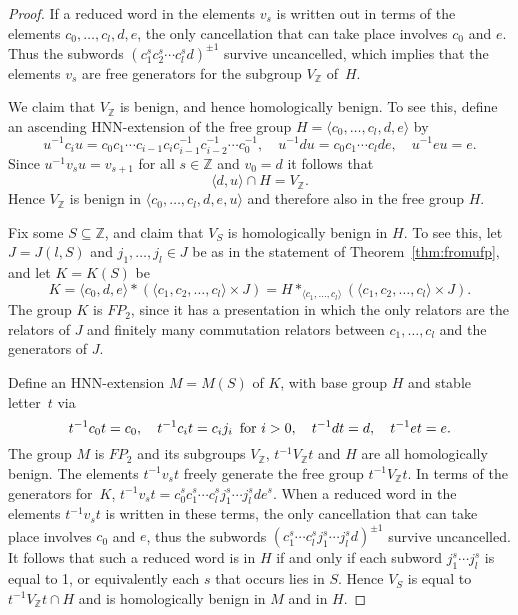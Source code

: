 \documentclass[12pt,a4paper]{article}
\newcommand{\zz}{{\mathbb Z}}
\begin{document}
\begin{proof} 
If a reduced word in the elements $v_s$ is written out in terms of the
elements $c_0,\ldots,c_l,d,e$, the only cancellation that can take
place involves $c_0$ and $e$.  Thus the subwords $(c_1^sc_2^s\cdots
c_l^sd)^{\pm 1}$ survive uncancelled, which implies that the elements $v_s$ are
free generators for the subgroup $V_\zz$ of~$H$.

We claim that $V_\zz$ is benign, and hence homologically benign.  To
see this, define an ascending HNN-extension of the free group
$H=\langle c_0,\ldots,c_l,d,e\rangle$ by
\[ u^{-1}c_iu = c_0c_1\cdots c_{i-1}c_ic_{i-1}^{-1}c_{i-2}^{-1}\cdots c_0^{-1}, 
\quad
u^{-1}du = c_0c_1\cdots c_lde, \quad 
u^{-1}eu = e.  \]
Since $u^{-1}v_su=v_{s+1}$ for all $s\in \zz$ and $v_0=d$ it follows that 
$$\langle d,u\rangle \cap H = V_\zz.$$ 
Hence $V_\zz$ is benign in $\langle c_0,\ldots,c_l,d,e,u\rangle$ and
therefore also in the free group $H$.  

Fix some $S\subseteq \zz$, and claim that $V_S$ is homologically 
benign in $H$.  To see 
this, let $J=J(l,S)$ and $j_1,\ldots, j_l\in J$ be as in the statement
of Theorem~\ref{thm:fromufp}, and let $K=K(S)$ be 
$$K=\langle c_0,d,e\rangle * (\langle c_1,c_2,\ldots, c_l\rangle \times 
J) = H*_{\langle c_1,\ldots,c_l\rangle} 
(\langle c_1,c_2,\ldots, c_l\rangle \times J).$$
The group $K$ is $FP_2$, since it has a presentation in which the 
only relators are the relators of $J$ and finitely many commutation 
relators between $c_1,\ldots, c_l$ and the generators of $J$.  

Define an HNN-extension $M=M(S)$ of $K$, with base group $H$ and stable 
letter~$t$ via
$$t^{-1}c_0t=c_0,\quad t^{-1}c_it= c_ij_i\,\,\,\hbox{for $i>0$},\quad 
t^{-1}dt=d,\quad t^{-1}et=e.$$ 
The group $M$ is $FP_2$ and its subgroups $V_\zz$, $t^{-1}V_\zz t$ and $H$ 
are all homologically benign.  The elements $t^{-1}v_st$ freely generate 
the free group $t^{-1}V_\zz t$.  In terms of the generators for~$K$, $t^{-1}v_st = 
c_0^sc_1^s\cdots c_l^sj_1^s\cdots j_l^s de^s$.  When a reduced word in 
the elements $t^{-1}v_st$ is written in these terms, the 
only cancellation that can take place involves $c_0$ and $e$, thus the 
subwords $(c_1^s\cdots c_l^s j_1^s\cdots j_l^sd)^{\pm 1}$ survive 
uncancelled.  It follows that such a reduced word is in $H$ if and 
only if each subword $j_1^s\cdots j_l^s$ is equal to 1, or equivalently
each $s$ that occurs lies in $S$.  Hence 
$V_S$ is equal to $t^{-1}V_\zz t\cap H$ and is homologically benign in 
$M$ and in $H$.    
\end{proof} 
\end{document}
